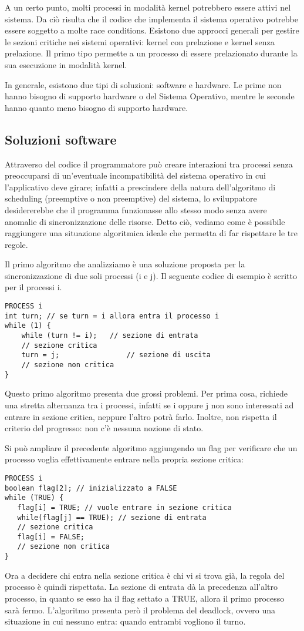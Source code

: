 \documentclass[a4]{article}
\begin{document}
A un certo punto, molti processi in modalità kernel potrebbero essere attivi nel sistema. Da ciò risulta che il codice che implementa il sistema operativo potrebbe essere soggetto a molte race conditions. Esistono due approcci generali per gestire le sezioni critiche nei sistemi operativi: kernel con prelazione e kernel senza prelazione. Il primo tipo permette a un processo di essere prelazionato durante la sua esecuzione in modalità kernel.

In generale, esistono due tipi di soluzioni: software e hardware. Le prime non hanno bisogno di supporto hardware o del Sistema Operativo, mentre le seconde hanno quanto meno bisogno di supporto hardware.

\subsection{Soluzioni software}
Attraverso del codice il programmatore può creare interazioni tra processi senza preoccuparsi di un’eventuale incompatibilità del sistema operativo in cui l’applicativo deve girare; infatti a prescindere della natura dell’algoritmo di scheduling (preemptive o non preemptive) del sistema, lo sviluppatore desidererebbe che il programma funzionasse allo stesso modo senza avere anomalie di sincronizzazione delle risorse. Detto ciò, vediamo come è possibile raggiungere una situazione algoritmica ideale che permetta di far rispettare le tre regole.

Il primo algoritmo che analizziamo è una soluzione proposta per la sincronizzazione di due soli processi (i e j). Il seguente codice di esempio è scritto per il processi i.
\begin{verbatim}
PROCESS i
int turn; // se turn = i allora entra il processo i
while (1) {
    while (turn != i);   // sezione di entrata
    // sezione critica
    turn = j;                // sezione di uscita
    // sezione non critica
}
\end{verbatim}
Questo primo algoritmo presenta due grossi problemi. Per prima cosa, richiede una stretta alternanza tra i processi, infatti se i oppure j non sono interessati ad entrare in sezione critica, neppure l'altro potrà farlo. Inoltre, non rispetta il criterio del progresso: non c'è nessuna nozione di stato.

Si può ampliare il precedente algoritmo aggiungendo un flag per verificare che un processo voglia effettivamente entrare nella propria sezione critica:
\begin{verbatim}
PROCESS i
boolean flag[2]; // inizializzato a FALSE
while (TRUE) {
   flag[i] = TRUE; // vuole entrare in sezione critica
   while(flag[j] == TRUE); // sezione di entrata
   // sezione critica
   flag[i] = FALSE;
   // sezione non critica
}
\end{verbatim}
Ora a decidere chi entra nella sezione critica è chi vi si trova già, la regola del processo è quindi rispettata. La sezione di entrata dà la precedenza all'altro processo, in quanto se esso ha il flag settato a TRUE, allora il primo processo sarà fermo. L'algoritmo presenta però il problema del deadlock, ovvero una situazione in cui nessuno entra: quando entrambi vogliono il turno.
\end{document}
